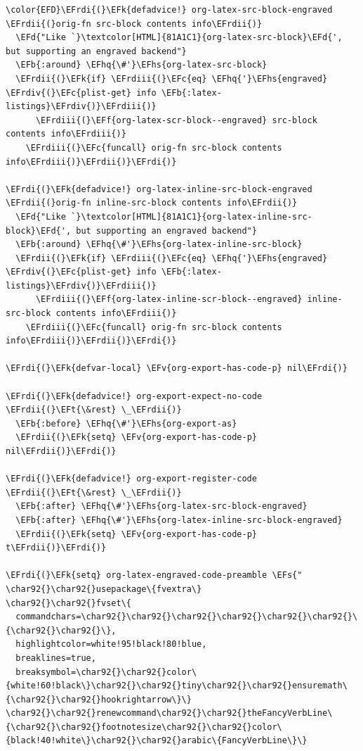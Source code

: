 \documentclass{scrartcl}
\newcommand{\EFk}[1]{\textcolor{EFk}{#1}} %
\newcommand{\EFd}[1]{\textcolor{EFd}{#1}} %
\newcommand{\EFt}[1]{\textcolor{EFt}{#1}} %
\newcommand{\EFs}[1]{\textcolor{EFs}{#1}} %
\newcommand{\EFb}[1]{\textcolor{EFb}{#1}} %
\newcommand{\EFc}[1]{\textcolor{EFc}{#1}} %
\newcommand{\EFv}[1]{\textcolor{EFv}{#1}} %
\newcommand{\EFf}[1]{\textcolor{EFf}{#1}} %
\newcommand{\EFhq}[1]{#1} %
\newcommand{\EFhs}[1]{#1} %
\newcommand{\EFrdi}[1]{#1} %
\newcommand{\EFrdii}[1]{#1} %
\newcommand{\EFrdiii}[1]{#1} %
\newcommand{\EFrdiv}[1]{#1} %
\begin{document}
\begin{Code}
\begin{Verbatim}[]
\color{EFD}\EFrdi{(}\EFk{defadvice!} org-latex-src-block-engraved \EFrdii{(}orig-fn src-block contents info\EFrdii{)}
  \EFd{"Like `}\textcolor[HTML]{81A1C1}{org-latex-src-block}\EFd{', but supporting an engraved backend"}
  \EFb{:around} \EFhq{\#'}\EFhs{org-latex-src-block}
  \EFrdii{(}\EFk{if} \EFrdiii{(}\EFc{eq} \EFhq{'}\EFhs{engraved} \EFrdiv{(}\EFc{plist-get} info \EFb{:latex-listings}\EFrdiv{)}\EFrdiii{)}
      \EFrdiii{(}\EFf{org-latex-scr-block--engraved} src-block contents info\EFrdiii{)}
    \EFrdiii{(}\EFc{funcall} orig-fn src-block contents info\EFrdiii{)}\EFrdii{)}\EFrdi{)}

\EFrdi{(}\EFk{defadvice!} org-latex-inline-src-block-engraved \EFrdii{(}orig-fn inline-src-block contents info\EFrdii{)}
  \EFd{"Like `}\textcolor[HTML]{81A1C1}{org-latex-inline-src-block}\EFd{', but supporting an engraved backend"}
  \EFb{:around} \EFhq{\#'}\EFhs{org-latex-inline-src-block}
  \EFrdii{(}\EFk{if} \EFrdiii{(}\EFc{eq} \EFhq{'}\EFhs{engraved} \EFrdiv{(}\EFc{plist-get} info \EFb{:latex-listings}\EFrdiv{)}\EFrdiii{)}
      \EFrdiii{(}\EFf{org-latex-inline-scr-block--engraved} inline-src-block contents info\EFrdiii{)}
    \EFrdiii{(}\EFc{funcall} orig-fn src-block contents info\EFrdiii{)}\EFrdii{)}\EFrdi{)}

\EFrdi{(}\EFk{defvar-local} \EFv{org-export-has-code-p} nil\EFrdi{)}

\EFrdi{(}\EFk{defadvice!} org-export-expect-no-code \EFrdii{(}\EFt{\&rest} \_\EFrdii{)}
  \EFb{:before} \EFhq{\#'}\EFhs{org-export-as}
  \EFrdii{(}\EFk{setq} \EFv{org-export-has-code-p} nil\EFrdii{)}\EFrdi{)}

\EFrdi{(}\EFk{defadvice!} org-export-register-code \EFrdii{(}\EFt{\&rest} \_\EFrdii{)}
  \EFb{:after} \EFhq{\#'}\EFhs{org-latex-src-block-engraved}
  \EFb{:after} \EFhq{\#'}\EFhs{org-latex-inline-src-block-engraved}
  \EFrdii{(}\EFk{setq} \EFv{org-export-has-code-p} t\EFrdii{)}\EFrdi{)}

\EFrdi{(}\EFk{setq} org-latex-engraved-code-preamble \EFs{"
\char92{}\char92{}usepackage\{fvextra\}
\char92{}\char92{}fvset\{
  commandchars=\char92{}\char92{}\char92{}\char92{}\char92{}\char92{}\{\char92{}\char92{}\},
  highlightcolor=white!95!black!80!blue,
  breaklines=true,
  breaksymbol=\char92{}\char92{}color\{white!60!black\}\char92{}\char92{}tiny\char92{}\char92{}ensuremath\{\char92{}\char92{}hookrightarrow\}\}
\char92{}\char92{}renewcommand\char92{}\char92{}theFancyVerbLine\{\char92{}\char92{}footnotesize\char92{}\char92{}color\{black!40!white\}\char92{}\char92{}arabic\{FancyVerbLine\}\}


\end{Verbatim}
\end{Code}
\end{document}
